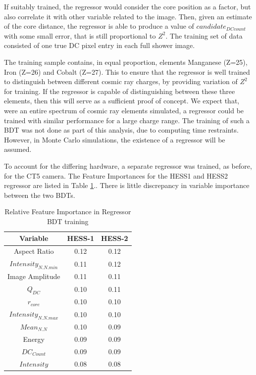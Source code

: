 \documentclass{article}
\begin{document}
If suitably trained, the regressor would consider the core position as a factor, but also correlate it with other variable related to the image. Then, given an estimate of the core distance, the regressor is able to produce a value of $candidate_{DC count}$ with some small error, that is still proportional to $Z^{2}$. The training set of data consisted of one true DC pixel entry in each full shower image. 

The training sample contains, in equal proportion, elements Manganese (Z=25), Iron (Z=26) and Cobalt (Z=27). This to ensure that the regressor is well trained to distinguish between different cosmic ray charges, by providing variation of $Z^{2}$ for training. If the regressor is capable of distinguishing between these three elements, then this will serve as a sufficient proof of concept. We expect that, were an entire spectrum of cosmic ray elements simulated, a regressor could be trained with similar performance for a large charge range. The training of such a BDT was not done as part of this analysis, due to computing time restraints. However, in Monte Carlo simulations, the existence of a regressor will be assumed.

To account for the differing hardware, a separate regressor was trained, as before, for the CT5 camera. The Feature Importances for the HESS1 and HESS2 regressor are listed in Table \ref{tab:regressor}.. There is little discrepancy in variable importance between the two BDTs.

\begin{table}[h!]
  \centering
  \caption{Relative Feature Importance in  Regressor BDT training}
  \label{tab:regressor}
  \begin{tabular}{ccc}
    \toprule
    Variable & HESS-1 & HESS-2 \\
    \midrule
    Aspect Ratio & 0.12 & 0.12\\
    $Intensity_{N.N.min}$ & 0.11 & 0.12\\
    Image Amplitude & 0.11 & 0.11\\
    $Q_{DC}$ & 0.10 & 0.11\\
    $r_{core}$ & 0.10 & 0.10\\
    $Intensity_{N.N.max}$ & 0.10 & 0.10\\
    $Mean_{N.N}$ & 0.10 & 0.09\\
    Energy & 0.09 & 0.09\\
    $DC_{Count}$ & 0.09 & 0.09\\
    $Intensity$ & 0.08 & 0.08\\
    \bottomrule
  \end{tabular}
\end{table}
\end{document}
